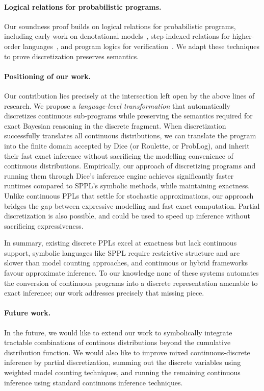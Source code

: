 \paragraph{Logical relations for probabilistic programs.}
Our soundness proof builds on logical relations for probabilistic programs, including early work on denotational models~\cite{Kozen1981Semantics,Jones1989Probabilistic}, step-indexed relations for higher-order languages~\cite{Bizjak2015Step,Wand2018Contextual}, and program logics for verification~\cite{Barthe2009Formal,Barthe2012Privacy}. We adapt these techniques to prove discretization preserves semantics.

\paragraph{Positioning of our work.}  
Our contribution lies precisely at the intersection left open by the above lines of research. We propose a \emph{language-level transformation} that automatically discretizes continuous sub-programs while preserving the semantics required for exact Bayesian reasoning in the discrete fragment. When discretization successfully translates all continuous distributions, we can translate the program into the finite domain accepted by Dice (or Roulette, or ProbLog), and inherit their fast exact inference without sacrificing the modelling convenience of continuous distributions. 
Empirically, our approach of discretizing programs and running them through Dice's inference engine achieves significantly faster runtimes compared to SPPL's symbolic methods, while maintaining exactness. Unlike continuous PPLs that settle for stochastic approximations, our approach bridges the gap between expressive modelling and fast exact computation. Partial discretization is also possible, and could be used to speed up inference without sacrificing expressiveness.

\medskip  
In summary, existing discrete PPLs excel at exactness but lack continuous support, symbolic languages like SPPL require restrictive structure and are slower than model counting approaches, and continuous or hybrid frameworks favour approximate inference. To our knowledge none of these systems automates the conversion of continuous programs into a discrete representation amenable to exact inference; our work addresses precisely that missing piece.

\paragraph{Future work.}
In the future, we would like to extend our work to symbolically integrate tractable combinations of continous distributions beyond the cumulative distribution function.
We would also like to improve mixed continuous-discrete inference by partial discretization, summing out the discrete variables using weighted model counting techniques, and running the remaining continuous inference using standard continuous inference techniques.